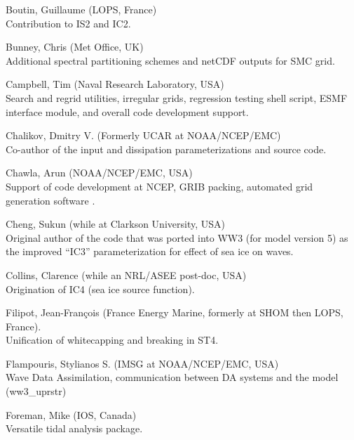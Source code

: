\begin{list}{\ldots}{ }
\item [Boutin, Guillaume] (LOPS, France) \\
  Contribution to IS2 and IC2. 

\item [Bunney, Chris] (Met Office, UK) \\
Additional spectral partitioning schemes and netCDF outputs for SMC grid.

\item [Campbell, Tim] (Naval Research Laboratory, USA)\\ 
  Search and regrid utilities, irregular grids, regression testing shell script, ESMF interface module, 
  and overall code development support.

\item [Chalikov, Dmitry V.] (Formerly UCAR at NOAA/NCEP/EMC) \\ Co-author of the
  \cite{tol:JPO96} input and dissipation parameterizations and source code.

\item [Chawla, Arun](NOAA/NCEP/EMC, USA) \\
  Support of code development at NCEP, GRIB packing, automated grid generation
  software \citep{tol:MMAB07a, tol:OMOD08a}.

\item [Cheng, Sukun] (while at Clarkson University, USA) \\
  Original author of the code that was ported into WW3 (for model version 5) as the improved ``IC3'' parameterization for effect of sea ice on waves.

\item [Collins, Clarence] (while an NRL/ASEE post-doc, USA) \\
  Origination of IC4 (sea ice source function).

\item [Filipot, Jean-Fran{\c c}ois] (France Energy Marine, formerly at SHOM then LOPS, France).\\
  Unification of whitecapping and breaking in ST4. 

\item [Flampouris, Stylianos S.] (IMSG at NOAA/NCEP/EMC, USA) \\
      Wave Data Assimilation, communication between DA systems and the model (ww3\_uprstr) 

\item [Foreman, Mike]  (IOS, Canada) \\
  Versatile tidal analysis package. 


\end{list}
